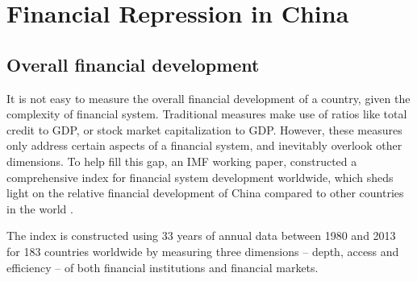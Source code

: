 \documentclass[AER]{AEA}
\begin{document}

\section{Financial Repression in China}
\label{sec:facts}

\subsection{Overall financial development}

It is not easy to measure the overall financial development of a country,
given the complexity of financial system. Traditional measures make
use of ratios like total credit to GDP, or stock market capitalization to GDP.
However, these measures only address certain aspects of a financial system, and
inevitably overlook other dimensions. To help fill this gap, an IMF working paper,
constructed a comprehensive index for financial system development
worldwide, which sheds light on the relative financial development of China
compared to other countries in the world \citep{sviry2016} . 

The index is constructed using 33 years of annual data between 1980 and 2013 for
183 countries worldwide by measuring three dimensions -- depth, access and 
efficiency -- of both financial institutions and financial markets. 


\end{document}
